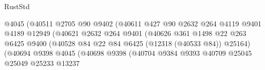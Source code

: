 \begin{lexlean}{RustStd}
\begin{coremodule}
                                            @4045
                                            (@40511
                                              @2705
                                              @90
                                              @9402
                                              (@40611
                                                @427
                                                @90
                                                @2632
                                                @264
                                                @4119
                                                @9401
                                                @4189
                                                @12949
                                                (@40621
                                                  @2632
                                                  @264
                                                  @9401
                                                  (@40626
                                                    @361
                                                    @1498
                                                    @22
                                                    @263
                                                    @6425
                                                    @9400
                                                    (@40528
                                                      @84
                                                      @22
                                                      @84
                                                      @6425
                                                      (@12318 (@40533 @84))
                                                      @25164)
                                                    (@40694
                                                      @9398
                                                      @4045
                                                      (@40698
                                                        @9398
                                                        (@40704
                                                          @9384
                                                          @9393
                                                          @40709
                                                          @25045
                                                          @25049
                                                          @25233
                                                          @13237

\end{coremodule}
\end{lexlean}
